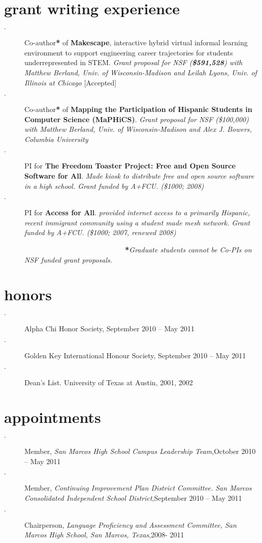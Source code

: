 \documentclass[hidelinks]{gnudon}
\begin{document}
\section{grant writing experience}
\begin{description}
\item[$\cdot$]Co-author\textbf{*} of \textbf{Makescape}, interactive hybrid virtual informal learning environment to support engineering career trajectories for students underrepresented in STEM. {\emph{\small{Grant proposal for NSF (\textbf{\$591,528}) with Matthew Berland, Univ. of Wisconsin-Madison and Leilah Lyons, Univ. of Illinois at Chicago}}} [Accepted]
\item[$\cdot$]Co-author\textbf{*} of \textbf{Mapping the Participation of Hispanic Students in Computer Science (MaPHiCS)}. {\emph{\small{Grant proposal for NSF (\$100,000) with Matthew Berland, Univ. of Wisconsin-Madison and Alex J. Bowers, Columbia University}}}
\item[$\cdot$]PI for \textbf{The Freedom Toaster Project: Free and Open Source Software for All}. {\emph{\small{Made kiosk to distribute free and open source software in a high school. Grant funded by A+FCU. (\$1000; 2008)}}}
\item[$\cdot$]PI for \textbf{Access for All}. {\emph{\small{provided internet access to a primarily Hispanic, recent immigrant community using a student made mesh network. Grant funded by A+FCU. (\$1000; 2007, renewed 2008)}}}

\begin{aside}
~
~
~
~
~
~
~
~
~
~
~
~
~
~
~
~
~
{\textbf{*}\emph{\small{Graduate students cannot be Co-PIs on NSF funded grant proposals.}}}
\end{aside}
\end{description}
\section{honors}
\begin{description}
\item[$\cdot$]Alpha Chi Honor Society, September 2010 – May 2011
\item[$\cdot$]Golden Key International Honour Society, September 2010 – May 2011\item[$\cdot$]Dean's List. University of Texas at Austin, 2001, 2002
\end{description}

\section{appointments}
\begin{description}
\item[$\cdot$]Member, {\emph{San Marcos High School Campus Leadership Team}},October 2010 – May 2011
\item[$\cdot$]Member, {\emph{Continuing Improvement Plan District Committee. San Marcos Consolidated Independent School District}},September 2010 – May 2011
\item[$\cdot$]Chairperson, {\emph{Language Proficiency and Assessment Committee, San Marcos High School, San Marcos, Texas}},2008- 2011
\end{description}
\end{document}
